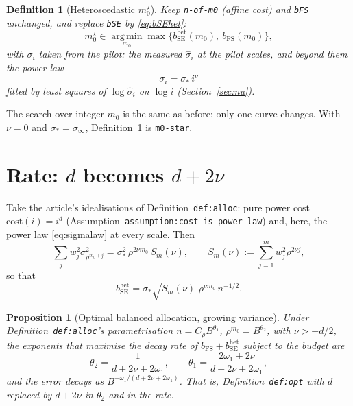\documentclass[11pt]{article}
\newtheorem{proposition}{Proposition}
\newtheorem{definition}{Definition}
\newcommand{\cost}{\mathrm{cost}}
\newcommand{\bSE}{b_{\mathrm{SE}}}
\newcommand{\bFS}{b_{\mathrm{FS}}}
\begin{document}
\begin{definition}[Heteroscedastic $m_0^\star$]\label{def:het}
Keep \texttt{n-of-m0} (affine cost) and \texttt{bFS} unchanged, and replace
\texttt{bSE} by \eqref{eq:bSEhet}:
\begin{equation}
  m_0^\star\in\operatorname*{arg\,min}_{m_0}
  \max\bigl\{\bSE^{\mathrm{het}}(m_0),\ \bFS(m_0)\bigr\},
  \label{eq:m0het}
\end{equation}
with $\sigma_i$ taken from the pilot: the measured $\hat\sigma_i$ at the pilot
scales, and beyond them the power law
\begin{equation}
  \sigma_i=\sigma_*\,i^{\nu}
  \label{eq:sigmalaw}
\end{equation}
fitted by least squares of $\log\hat\sigma_i$ on $\log i$ (Section~\ref{sec:nu}).
\end{definition}

\noindent The search over integer $m_0$ is the same as before; only one curve
changes. With $\nu=0$ and $\sigma_*=\sigma_\infty$, Definition~\ref{def:het} is
\texttt{m0-star}.

\section{Rate: \texorpdfstring{$d$}{d} becomes \texorpdfstring{$d+2\nu$}{d+2nu}}

Take the article's idealisations of Definition~\texttt{def:alloc}: pure power
cost $\cost(i)=i^d$ (Assumption~\texttt{assumption:}\allowbreak\texttt{cost\_is\_power\_law}) and,
here, the power law \eqref{eq:sigmalaw} at every scale. Then
\[
  \sum_jw_j^2\sigma_{\rho^{m_0+j}}^2=\sigma_*^2\,\rho^{2\nu m_0}\,S_m(\nu),
  \qquad
  S_m(\nu):=\sum_{j=1}^mw_j^2\rho^{2\nu j},
\]
so that
\begin{equation}
  \bSE^{\mathrm{het}}=\sigma_*\sqrt{S_m(\nu)}\;\rho^{\nu m_0}\,n^{-1/2}.
  \label{eq:bSEpower}
\end{equation}

\begin{proposition}[Optimal balanced allocation, growing variance]\label{prop:het}
Under Definition~\texttt{def:alloc}'s parametrisation $n=C_\rho B^{\theta_1}$,
$\rho^{m_0}=B^{\theta_2}$, with $\nu>-d/2$, the exponents that maximise the
decay rate of $\bFS+\bSE^{\mathrm{het}}$ subject to the budget are
\begin{equation}
  \theta_2=\frac{1}{d+2\nu+2\omega_1},\qquad
  \theta_1=\frac{2\omega_1+2\nu}{d+2\nu+2\omega_1},
  \label{eq:thetahet}
\end{equation}
and the error decays as $B^{-\omega_1/(d+2\nu+2\omega_1)}$. That is,
Definition~\texttt{def:opt} with $d$ replaced by $d+2\nu$ in $\theta_2$ and in
the rate.
\end{proposition}
\end{document}
